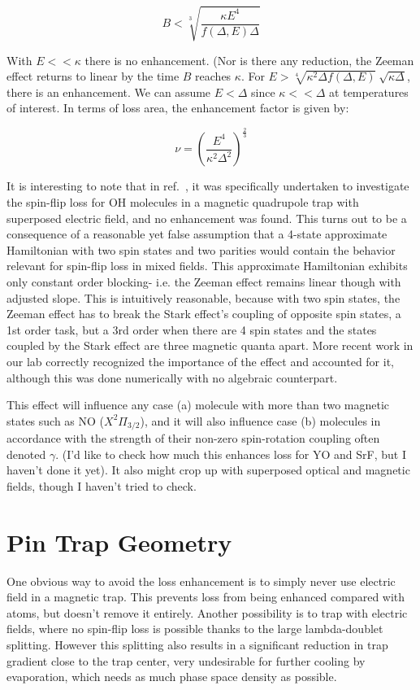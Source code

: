 \documentclass[%
 reprint,
 amsmath,amssymb,
 aps,
prl,
]{revtex4-1}
\begin{document}
\begin{equation}
B < \sqrt[3]{\frac{\kappa E^4}{f(\Delta,E)\Delta}}
\end{equation}

\noindent With $E<<\kappa$ there is no enhancement. (Nor is there any reduction, the Zeeman effect returns to linear by the time $B$ reaches $\kappa$. For $E>\sqrt[4]{\kappa^2\Delta f(\Delta,E)}~\sqrt{\kappa\Delta}$, there is an enhancement. We can assume $E<\Delta$ since $\kappa<<\Delta$ at temperatures of interest. In terms of loss area, the enhancement factor is given by:

\begin{equation}
\nu = \left(\frac{E^4}{\kappa^2\Delta^2}\right)^\frac{2}{3}
\label{eq:blimit}
\end{equation} 

It is interesting to note that in ref.~\cite{Lara2008}, it was specifically undertaken to investigate the spin-flip loss for OH molecules in a magnetic quadrupole trap with superposed electric field, and no enhancement was found. This turns out to be a consequence of a reasonable yet false assumption that a 4-state approximate Hamiltonian with two spin states and two parities would contain the behavior relevant for spin-flip loss in mixed fields. This approximate Hamiltonian exhibits only constant order blocking- i.e. the Zeeman effect remains linear though with adjusted slope. This is intuitively reasonable, because with two spin states, the Zeeman effect has to break the Stark effect's coupling of opposite spin states, a 1st order task, but a 3rd order when there are 4 spin states and the states coupled by the Stark effect are three magnetic quanta apart. More recent work in our lab correctly recognized the importance of the effect and accounted for it, although this was done numerically with no algebraic counterpart.

This effect will influence any case (a) molecule with more than two magnetic states such as NO ($X^2\Pi_{3/2}$), and it will also influence case (b) molecules in accordance with the strength of their non-zero spin-rotation coupling often denoted $\gamma$. (I'd like to check how much this enhances loss for YO and SrF, but I haven't done it yet). It also might crop up with superposed optical and magnetic fields, though I haven't tried to check.

\section{Pin Trap Geometry \label{sec:ptg} }
One obvious way to avoid the loss enhancement is to simply never use electric field in a magnetic trap. This prevents loss from being enhanced compared with atoms, but doesn't remove it entirely. Another possibility is to trap with electric fields, where no spin-flip loss is possible thanks to the large lambda-doublet splitting. However this splitting also results in a significant reduction in trap gradient close to the trap center, very undesirable for further cooling by evaporation, which needs as much phase space density as possible.
\end{document}
